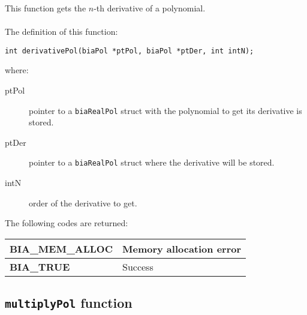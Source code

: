 This function gets the $n$-th derivative of a polynomial.\\ \\
%
The definition of this function:
%
\begin{verbatim}
int derivativePol(biaPol *ptPol, biaPol *ptDer, int intN);
\end{verbatim}
%
where:
\begin{description} 
\item[ptPol] pointer to a \texttt{biaRealPol} struct with the polynomial to get its derivative is stored.
\item[ptDer] pointer to a \texttt{biaRealPol} struct where the derivative will be stored.
\item[intN] order of the derivative to get.
\end{description}
%
The following codes are returned:
%
\begin{center}
\begin{tabular}{|l|l|}
\hline
\textbf{BIA\_MEM\_ALLOC} & Memory allocation error \\
\hline
\textbf{BIA\_TRUE} & Success \\
\hline
\end{tabular}
\end{center}
%
%

\subsection{\texttt{multiplyPol} function}

